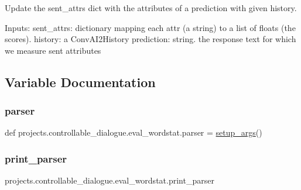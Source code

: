 \begin{DoxyVerb}Update the sent_attrs dict with the attributes of a prediction with given history.

Inputs:
  sent_attrs: dictionary mapping each attr (a string) to a list of floats
    (the scores).
  history: a ConvAI2History
  prediction: string. the response text for which we measure sent attributes
\end{DoxyVerb}
 

\subsection{Variable Documentation}
\mbox{\label{namespaceprojects_1_1controllable__dialogue_1_1eval__wordstat_a05732672672c5c3d67e5941ec220d589}} 
\subsubsection{\texorpdfstring{parser}{parser}}
{\footnotesize\ttfamily def projects.\+controllable\+\_\+dialogue.\+eval\+\_\+wordstat.\+parser = \hyperlink{namespaceprojects_1_1controllable__dialogue_1_1eval__wordstat_aa40ff30af74bd5824589612828146ec8}{setup\+\_\+args}()}

\mbox{\label{namespaceprojects_1_1controllable__dialogue_1_1eval__wordstat_ada9cf33816fefa715c6df2aee0b8125d}} 
\subsubsection{\texorpdfstring{print\+\_\+parser}{print\_parser}}
{\footnotesize\ttfamily projects.\+controllable\+\_\+dialogue.\+eval\+\_\+wordstat.\+print\+\_\+parser}


